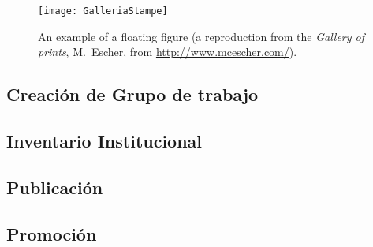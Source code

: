 \documentclass[
10pt, %
letterpaper, %
oneside, %
headinclude,footinclude, %
BCOR5mm, %
]{scrartcl}
\begin{document}
\begin{figure}[tb]
\centering 
\texttt{[image: GalleriaStampe]} 
\caption[An example of a floating figure]{An example of a floating figure (a reproduction from the \emph{Gallery of prints}, M.~Escher, from \url{http://www.mcescher.com/}).} %
\label{fig:gallery} 
\end{figure}


\subsection{Creación de Grupo de trabajo}


\subsection{Inventario Institucional}
\cite{_nih_????}

\subsection{Publicación}


\subsection{Promoción}
\cite{schofield_post-publication_2009}



\renewcommand{\refname}{\spacedlowsmallcaps{References}} %



%


\end{document}
